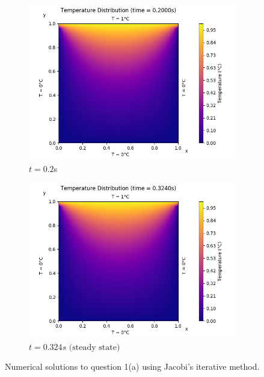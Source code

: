 \documentclass[a4paper]{article}
\begin{document}
\begin{figure}[H]
			\medskip
			\begin{subfigure}{0.48\textwidth}
				\includegraphics[width=\linewidth]{figures/1a_implicit/5)t=200ms.png}
				\caption{$t = 0.2$s}
			\end{subfigure}\hspace*{\fill}
			\begin{subfigure}{0.48\textwidth}
				\includegraphics[width=\linewidth]{figures/1a_implicit/6)t=324ms(ss).png}
				\caption{$t = 0.324s \text{ (steady state)}$}
				\label{solution_1a_implicit_ss}
			\end{subfigure}
			
			\caption{Numerical solutions to question 1(a) using Jacobi's iterative method.} \label{solution_1a_implicit}
		\end{figure}
		
\end{document}
